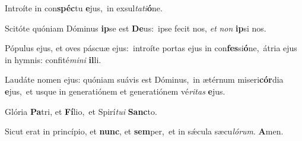 Introíte in con\textbf{spéc}tu \textbf{e}jus,~\redgreheightstar in exsul\textit{ta}\textit{ti}\textbf{ó}ne.

Scitóte quóniam Dóminus \textbf{ip}se est \textbf{De}us:~\redgreheightstar ipse fecit nos, \textit{et} \textit{non} \textbf{ip}si nos.

Pópulus ejus, et oves páscuæ ejus:~\reddagger introíte portas ejus in con\textbf{fes}si\textbf{ó}ne,~\redgreheightstar átria ejus in hymnis: confité\textit{mi}\textit{ni} \textbf{il}li.

Laudáte nomen ejus: quóniam suávis est Dóminus,~\reddagger in ætérnum miseri\textbf{cór}dia \textbf{e}jus,~\redgreheightstar et usque in generatiónem et generatiónem vé\textit{ri}\textit{tas} \textbf{e}jus.

Glória \textbf{Pa}tri, et \textbf{Fí}lio,~\redgreheightstar et Spirí\textit{tu}\textit{i} \textbf{Sanc}to.

Sicut erat in princípio, et \textbf{nunc}, et \textbf{sem}per,~\redgreheightstar et in sǽcula sæcu\textit{ló}\textit{rum}. \textbf{A}men.
